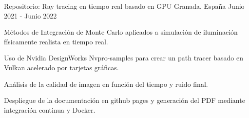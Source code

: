 
\begin{cventries}
    \cventry
    {Repositorio: }
    {Ray tracing en tiempo real basado en GPU}
    {Granada, España}
    {Junio 2021 - Junio 2022}
    {
      \begin{cvitems} %
        \item {Métodos de Integración de Monte Carlo aplicados a simulación de iluminación físicamente realista en tiempo real.}
        \item {Uso de Nvidia DesignWorks Nvpro-samples para crear un path tracer basado en Vulkan acelerado por tarjetas gráficas.}
        \item {Análisis de la calidad de imagen en función del tiempo y ruido final.}
        \item {Despliegue de la documentación en github pages y generación del PDF mediante integración continua y Docker.}
      \end{cvitems}
    }
\end{cventries}